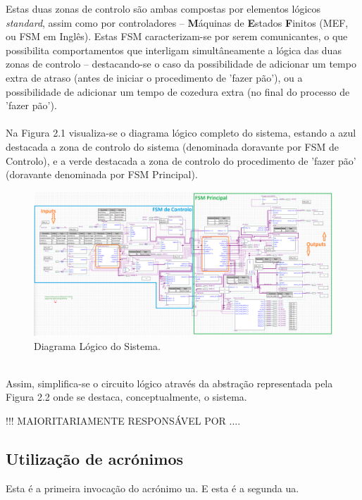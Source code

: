 \documentclass{report}
\begin{document}
Estas duas zonas de controlo são ambas compostas por elementos lógicos \textit{standard}, assim como por controladores -- \textbf{M}áquinas de \textbf{E}stados \textbf{F}initos (MEF, ou FSM em Inglês). Estas FSM caracterizam-se por serem comunicantes, o que possibilita comportamentos que interligam simultâneamente a lógica das duas zonas de controlo -- destacando-se o caso da possibilidade de adicionar um tempo extra de atraso (antes de iniciar o procedimento de 'fazer pão'), ou a possibilidade de adicionar um tempo de cozedura extra (no final do processo de 'fazer pão').
\\\\
Na Figura 2.1 visualiza-se o diagrama lógico completo do sistema, estando a azul destacada a zona de controlo do sistema (denominada doravante por FSM de Controlo), e a verde destacada a zona de controlo do procedimento de 'fazer pão' (doravante denominada por FSM Principal).
\begin{figure}[h!] %
	\center
	\includegraphics[width=345pt]{images/fase2v9_2}
	\caption{Diagrama Lógico do Sistema.}
	\label{fig:imagem1}
\end{figure}
\\
Assim, simplifica-se o circuito lógico através da abstração representada pela Figura 2.2 onde se destaca, conceptualmente, o sistema.





!!! MAIORITARIAMENTE RESPONSÁVEL POR ....









\subsection{Utilização de acrónimos}
Esta é a primeira invocação do acrónimo \ac{ua}.
E esta é a segunda \ac{ua}.
\end{document}
